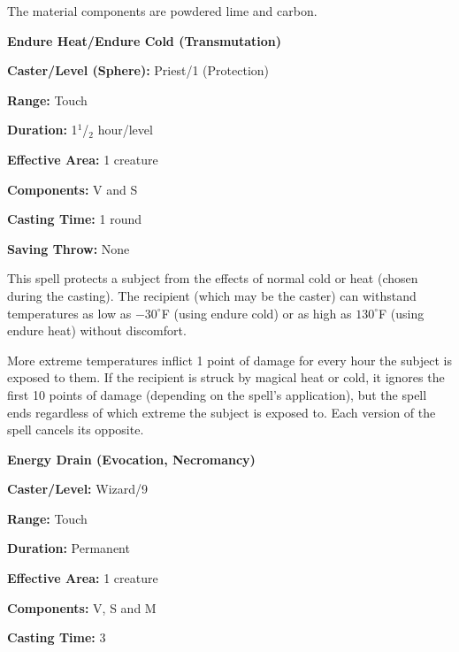 \begin{multicols}{2}
The material components are powdered lime and carbon.

\vspace{1em}

\noindent
\begin{minipage}{\columnwidth}

\noindent \textbf{Endure Heat/Endure Cold (Transmutation)}

\noindent \textbf{Caster/Level (Sphere):} Priest/1 (Protection)

\noindent \textbf{Range:} Touch

\noindent \textbf{Duration:} 1$^1$/$_2$ hour/level

\noindent \textbf{Effective Area:} 1 creature

\noindent \textbf{Components:} V and S

\noindent \textbf{Casting Time:} 1 round

\noindent \textbf{Saving Throw:} None

\end{minipage}

This spell protects a subject from the effects of normal cold or heat (chosen during the casting).  The recipient (which may be the caster) can withstand temperatures as low as $-30^\circ$F (using endure cold) or as high as $130^\circ$F (using endure heat) without discomfort.  

More extreme temperatures inflict 1 point of damage for every hour the subject is exposed to them.  If the recipient is struck by magical heat or cold, it ignores the first 10 points of damage (depending on the spell's application), but the spell ends regardless of which extreme the subject is exposed to.  Each version of the spell cancels its opposite.

\vspace{1em}

\noindent
\begin{minipage}{\columnwidth}

\noindent \textbf{Energy Drain (Evocation, Necromancy)}

\noindent \textbf{Caster/Level:} Wizard/9

\noindent \textbf{Range:} Touch

\noindent \textbf{Duration:} Permanent

\noindent \textbf{Effective Area:} 1 creature

\noindent \textbf{Components:} V, S and M

\noindent \textbf{Casting Time:} 3


\end{minipage}
\end{multicols}
